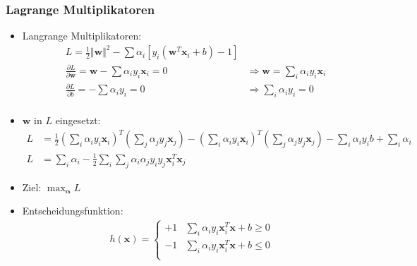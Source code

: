 \begin{frame}
    \frametitle{Lagrange Multiplikatoren}

    \begin{itemize}
        \item Langrange Multiplikatoren:
            \begin{align*}
                &L = \frac{1}{2} \Vert \boldsymbol{w} \Vert^2 - \sum \alpha_i \left[ y_i ( \boldsymbol{w}^T \boldsymbol{x}_i + b) - 1 \right] \\
                &\frac{\partial L}{\partial \boldsymbol{w}} = \boldsymbol{w} - \sum \alpha_i y_i \boldsymbol{x}_i = 0 &\Rightarrow \boldsymbol{w} = \sum_i \alpha_i y_i \boldsymbol{x}_i \\
                &\frac{\partial L}{\partial b} = -\sum \alpha_i y_i = 0 &\Rightarrow \sum_i \alpha_i y_i = 0 \\
            \end{align*}
        \item $\boldsymbol{w}$ in $L$ eingesetzt:
            \begin{align*}
                L &= \frac{1}{2} (\sum_i \alpha_i y_i \boldsymbol{x}_i)^T (\sum_j \alpha_j y_j \boldsymbol{x}_j) - (\sum_i \alpha_i y_i \boldsymbol{x}_i)^T (\sum_j \alpha_j y_j \boldsymbol{x}_j) - \sum_i \alpha_i y_i b + \sum_i \alpha_i \\
                L &= \sum_i \alpha_i - \frac{1}{2} \sum_i \sum_j \alpha_i \alpha_j y_i y_j \boldsymbol{x}_i^T \boldsymbol{x}_j
            \end{align*}
        \item Ziel: $ \max_{\boldsymbol{\alpha}} L $
        \item Entscheidungsfunktion:
            \begin{align*}
                h(\boldsymbol{x}) = \begin{cases}
                    +1 & \sum_i \alpha_i y_i \boldsymbol{x}_i^T \boldsymbol{x} + b \geq 0 \\
                    -1 & \sum_i \alpha_i y_i \boldsymbol{x}_i^T \boldsymbol{x} + b \leq 0 \\
                \end{cases}
            \end{align*}
    \end{itemize}
\end{frame}

